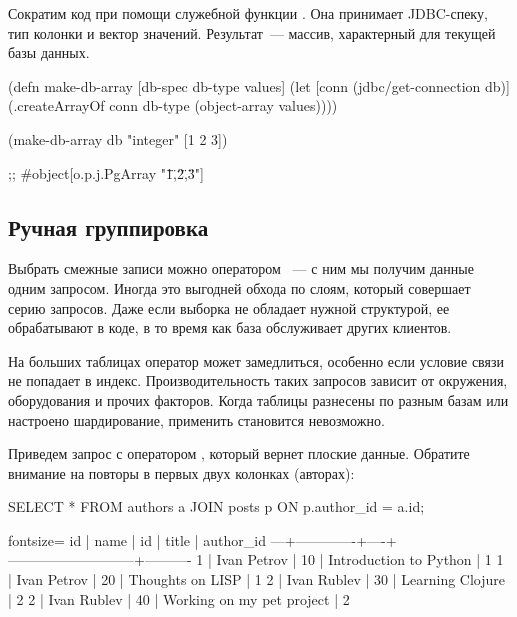 Сократим код при помощи служебной функции . Она принимает JDBC-спеку, тип колонки и вектор значений. Результат~--- массив, характерный для текущей базы данных.

\begin{english}
  \begin{clojure}
(defn make-db-array
  [db-spec db-type values]
  (let [conn (jdbc/get-connection db)]
    (.createArrayOf conn db-type
                    (object-array values))))

(make-db-array db "integer" [1 2 3])

;; #object[o.p.j.PgArray "{\"1\",\"2\",\"3\"}"]
  \end{clojure}
\end{english}

\subsection{Ручная группировка}

Выбрать смежные записи можно оператором ~--- с ним мы получим данные одним запросом. Иногда это выгодней обхода по слоям, который совершает серию запросов. Даже если выборка не обладает нужной структурой, ее обрабатывают в коде, в то время как база обслуживает других клиентов.

На больших таблицах оператор  может замедлиться, особенно если условие связи не попадает в индекс. Производительность таких запросов зависит от окружения, оборудования и прочих факторов. Когда таблицы разнесены по разным базам или настроено шардирование, применить  становится невозможно.

Приведем запрос с оператором , который вернет плоские данные. Обратите внимание на повторы в первых двух колонках (авторах):

\begin{english}
  \begin{sql}
SELECT *
FROM authors a
JOIN posts p ON p.author_id = a.id;
  \end{sql}
\end{english}

\begin{english}
  \begin{text*}{fontsize=\small}
id |    name     | id |            title          | author_id
---+-------------+----+---------------------------+----------
 1 | Ivan Petrov | 10 | Introduction to Python    |         1
 1 | Ivan Petrov | 20 | Thoughts on LISP          |         1
 2 | Ivan Rublev | 30 | Learning Clojure          |         2
 2 | Ivan Rublev | 40 | Working on my pet project |         2
  \end{text*}
\end{english}


